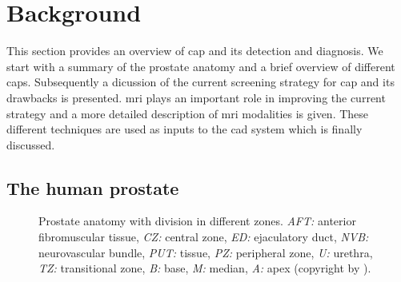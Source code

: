 \section{Background} \label{sec:background}

This section provides an overview of \ac{cap} and its detection and diagnosis. We start with a summary of the prostate anatomy and a brief overview of different \acp{cap}. Subsequently a dicussion of the current screening strategy for \ac{cap} and its drawbacks is presented. \ac{mri} plays an important role in improving the current strategy and a more detailed description of \ac{mri} modalities is given. These different techniques are used as inputs to the \acs{cad} system which is finally discussed.

\subsection{The human prostate}\label{subsec:humpro}

\begin{figure}
	\centering
	\hspace*{\fill}
			\hfill
	\hspace*{\fill}
	\caption{Prostate anatomy with division in different zones. \textit{AFT:} anterior fibromuscular tissue, \textit{CZ:} central zone, \textit{ED:} ejaculatory duct, \textit{NVB:} neurovascular bundle, \textit{PUT:}  tissue, \textit{PZ:} peripheral zone, \textit{U:} urethra, \textit{TZ:} transitional zone, \textit{B:} base, \textit{M:} median, \textit{A:} apex (copyright by \cite{Choi2007}).}
	\label{fig:anatomyProstateZone}
\end{figure}

